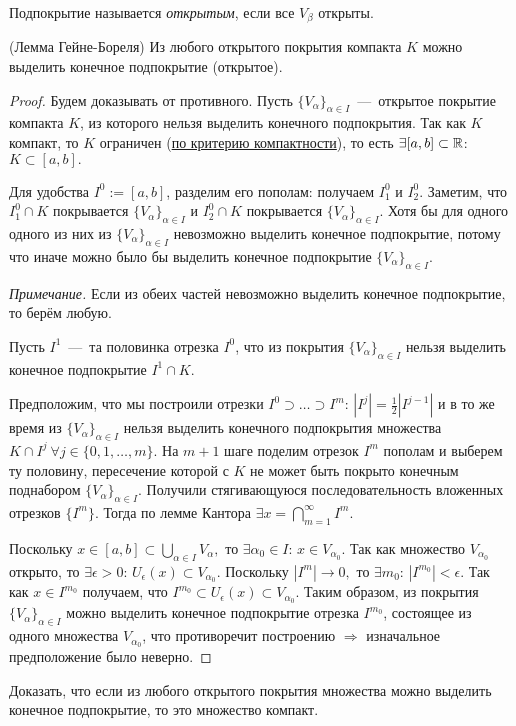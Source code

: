 \begin{definition}
    Подпокрытие называется \textit{открытым}, если все $V_{\beta}$ открыты.
\end{definition}
\begin{lemma}
    (Лемма Гейне-Бореля) Из любого открытого покрытия компакта $K$ можно выделить конечное подпокрытие (открытое).
\end{lemma}
\begin{proof}
    Будем доказывать от противного. Пусть $\{ V_{\alpha}\}_{\alpha \in I}$~---~открытое покрытие компакта $K$, из которого нельзя выделить конечного подпокрытия. Так как $K$ компакт, то $K$ ограничен (\hyperlink{thm3.2}{по критерию компактности}), то есть $\exists [a, b] \subset \mathbb{R}$: $K \subset [a, b].$ 
    
    Для удобства $I^{0} := [a, b]$, разделим его пополам: получаем $I^{0}_{1}$ и $I^{0}_{2}$. Заметим, что $I^{0}_{1} \cap K$ покрывается $\{ V_{\alpha}\}_{\alpha \in I}$ и $I^{0}_{2} \cap K$ покрывается $\{ V_{\alpha}\}_{\alpha \in I}$. Хотя бы для одного одного из них из $\{ V_{\alpha}\}_{\alpha \in I}$ невозможно выделить конечное подпокрытие, потому что иначе можно было бы выделить конечное подпокрытие $\{ V_{\alpha} \}_{\alpha \in I}$.

    \textit{Примечание.} Если из обеих частей невозможно выделить конечное подпокрытие, то берём любую.

    Пусть $I^{1}$~---~та половинка отрезка $I^{0}$, что из покрытия $\{ V_{\alpha}\}_{\alpha \in I}$ нельзя выделить конечное подпокрытие $I^{1} \cap K.$

    Предположим, что мы построили отрезки $I^{0} \supset \ldots \supset I^{m}$: $|I^{j}| = \frac{1}{2}|I^{j - 1}|$ и в то же время из $\{ V_{\alpha}\}_{\alpha \in I}$ нельзя выделить конечного подпокрытия множества $K \cap I^{j} \ \forall j \in \{ 0, 1, \ldots, m\}.$ На $m + 1$ шаге поделим отрезок $I^{m}$ пополам и выберем ту половину, пересечение которой с $K$ не может быть покрыто конечным поднабором $\{ V_{\alpha}\}_{\alpha \in I}.$ Получили стягивающуюся последовательность вложенных отрезков $\{ I^{m} \}$. Тогда по лемме Кантора $\displaystyle \exists x = \bigcap_{m = 1}^{\infty} I^{m}.$ 
    
    Поскольку $\displaystyle x \in [a, b] \subset \bigcup_{\alpha \in I} { V_{\alpha}},$ то $\displaystyle \exists \alpha_{0} \in I$: $x \in V_{\alpha_{0}}.$ Так как множество $\displaystyle V_{\alpha_{0}}$ открыто, то $\displaystyle \exists \epsilon > 0$: $\displaystyle U_{\epsilon} (x) \subset V_{\alpha_{0}}.$ Поскольку $\displaystyle |I^{m}| \to 0,$ то $\exists m_{0}$: $\displaystyle |I^{m_{0}}| < \epsilon$. Так как $\displaystyle x \in I^{m_{0}}$ получаем, что $\displaystyle I^{m_{0}} \subset U_{\epsilon} (x) \subset V_{\alpha_{0}}.$ Таким образом, из покрытия $\displaystyle \{ V_{\alpha}\}_{\alpha \in I}$ можно выделить конечное подпокрытие отрезка $I^{m_{0}}$, состоящее из одного множества $V_{\alpha_{0}}$, что противоречит построению $\Rightarrow$ изначальное предположение было неверно.
\end{proof}
\begin{problem}
    Доказать, что если из любого открытого покрытия множества можно выделить конечное подпокрытие, то это множество компакт.
\end{problem}